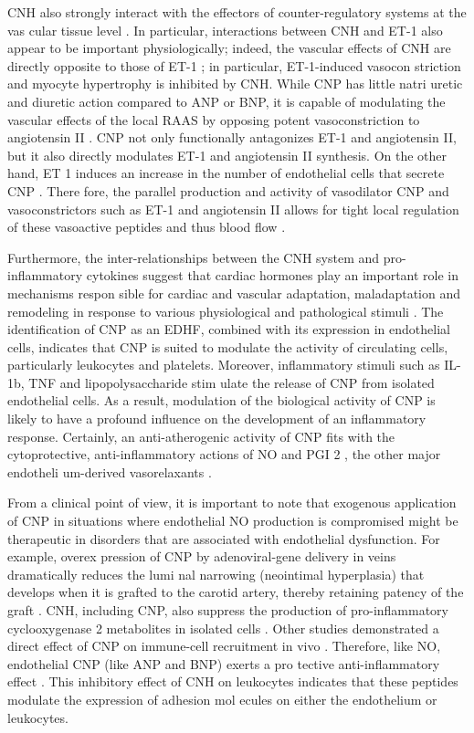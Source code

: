 \documentclass[14pt,a4paper,onecolumn]{extarticle}
\begin{document}
CNH also strongly interact with the effectors of counter-regulatory systems at the vas cular tissue level \citep{13}\citep{28}\citep{30}\citep{77}\citep{78}\citep{90-99}. In particular, interactions between CNH and ET-1 also appear to be important physiologically; indeed, the vascular effects of CNH are directly opposite to those of ET-1 \citep{267}\citep{269}; in particular, ET-1-induced vasocon striction and myocyte hypertrophy is inhibited by CNH. While CNP has little natri uretic and diuretic action compared to ANP or BNP, it is capable of modulating the vascular effects of the local RAAS by opposing potent vasoconstriction to angiotensin II \citep{269}. CNP not only functionally antagonizes ET-1 and angiotensin II, but it also directly modulates ET-1 \citep{277} and angiotensin II \citep{278} synthesis. On the other hand, ET 1 induces an increase in the number of endothelial cells that secrete CNP \citep{279}. There fore, the parallel production and activity of vasodilator CNP and vasoconstrictors such as ET-1 and angiotensin II allows for tight local regulation of these vasoactive peptides and thus blood flow \citep{267}\citep{269}\citep{279}.

Furthermore, the inter-relationships between the CNH system and pro-inflammatory cytokines suggest that cardiac hormones play an important role in mechanisms respon sible for cardiac and vascular adaptation, maladaptation and remodeling in response to various physiological and pathological stimuli \citep{32}\citep{35}\citep{62}\citep{162}. The identification of CNP as an EDHF, combined with its expression in endothelial cells, indicates that CNP is suited to modulate the activity of circulating cells, particularly leukocytes and platelets.  Moreover, inflammatory stimuli such as IL-1b, TNF and lipopolysaccharide \citep{280} stim ulate the release of CNP from isolated endothelial cells. As a result, modulation of the biological activity of CNP is likely to have a profound influence on the development of an inflammatory response. Certainly, an anti-atherogenic activity of CNP fits with the cytoprotective, anti-inflammatory actions of NO and PGI 2 , the other major endotheli um-derived vasorelaxants \citep{267}\citep{269-271}\citep{280}.

From a clinical point of view, it is important to note that exogenous application of CNP in situations where endothelial NO production is compromised might be therapeutic in disorders that are associated with endothelial dysfunction. For example, overex pression of CNP by adenoviral-gene delivery in veins dramatically reduces the lumi nal narrowing (neointimal hyperplasia) that develops when it is grafted to the carotid artery, thereby retaining patency of the graft \citep{281}. CNH, including CNP, also suppress the production of pro-inflammatory cyclooxygenase 2 metabolites in isolated cells \citep{106}\citep{282}. Other studies demonstrated a direct effect of CNP on immune-cell recruitment in vivo \citep{267}\citep{271}. Therefore, like NO, endothelial CNP (like ANP and BNP) exerts a pro tective anti-inflammatory effect \citep{104-106}\citep{267}\citep{271}\citep{283}. This inhibitory effect of CNH on leukocytes indicates that these peptides modulate the expression of adhesion mol ecules on either the endothelium or leukocytes.
\end{document}
